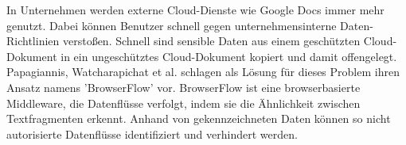 In Unternehmen werden externe Cloud-Dienste wie Google Docs immer mehr genutzt. Dabei können Benutzer schnell gegen unternehmensinterne Daten-Richtlinien verstoßen. Schnell sind sensible Daten aus einem geschützten Cloud-Dokument in ein ungeschütztes Cloud-Dokument kopiert und damit offengelegt. Papagiannis, Watcharapichat et al. \cite{Papagiannis.2016} schlagen als Lösung für dieses Problem ihren Ansatz namens 'BrowserFlow' vor. BrowserFlow ist eine browserbasierte Middleware, die Datenflüsse verfolgt, indem sie die Ähnlichkeit zwischen Textfragmenten erkennt. Anhand von gekennzeichneten Daten können so nicht autorisierte Datenflüsse identifiziert und verhindert werden.
